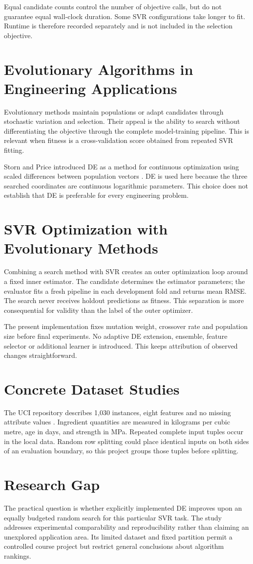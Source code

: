 Equal candidate counts control the number of objective calls, but do not guarantee equal wall-clock duration. Some SVR configurations take longer to fit. Runtime is therefore recorded separately and is not included in the selection objective.
\section{Evolutionary Algorithms in Engineering Applications}
Evolutionary methods maintain populations or adapt candidates through stochastic variation and selection. Their appeal is the ability to search without differentiating the objective through the complete model-training pipeline. This is relevant when fitness is a cross-validation score obtained from repeated SVR fitting.

Storn and Price introduced DE as a method for continuous optimization using scaled differences between population vectors \cite{storn}. DE is used here because the three searched coordinates are continuous logarithmic parameters. This choice does not establish that DE is preferable for every engineering problem.
\section{SVR Optimization with Evolutionary Methods}
Combining a search method with SVR creates an outer optimization loop around a fixed inner estimator. The candidate determines the estimator parameters; the evaluator fits a fresh pipeline in each development fold and returns mean RMSE. The search never receives holdout predictions as fitness. This separation is more consequential for validity than the label of the outer optimizer.

The present implementation fixes mutation weight, crossover rate and population size before final experiments. No adaptive DE extension, ensemble, feature selector or additional learner is introduced. This keeps attribution of observed changes straightforward.
\section{Concrete Dataset Studies}
The UCI repository describes 1,030 instances, eight features and no missing attribute values \cite{uci}. Ingredient quantities are measured in kilograms per cubic metre, age in days, and strength in MPa. Repeated complete input tuples occur in the local data. Random row splitting could place identical inputs on both sides of an evaluation boundary, so this project groups those tuples before splitting.
\section{Research Gap}
The practical question is whether explicitly implemented DE improves upon an equally budgeted random search for this particular SVR task. The study addresses experimental comparability and reproducibility rather than claiming an unexplored application area. Its limited dataset and fixed partition permit a controlled course project but restrict general conclusions about algorithm rankings.
